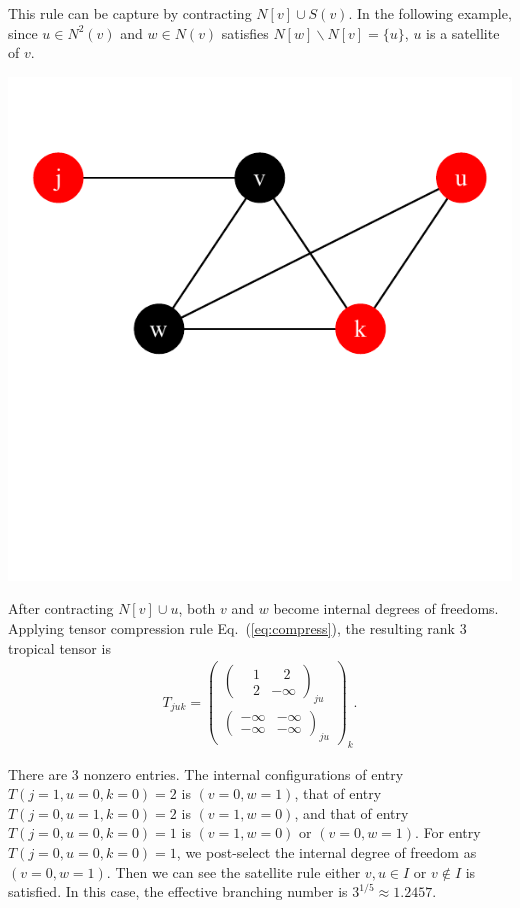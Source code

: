 \documentclass{article}
\newcommand{\<}{\langle}
\renewcommand{\>}{\rangle}
\newcommand{\Eq}[1]{Eq.~(\ref{#1})}
\theoremstyle{definition}\newtheorem{definition}{\textit{Definition}}
\begin{document}
This rule can be capture by contracting $N[v] \cup S(v)$.
In the following example, since $u \in N^2(v)$ and $w \in N(v)$ satisfies $N[w] \backslash N[v] = \{u\}$, $u$ is a satellite of $v$.

\centerline{\includegraphics[width=0.4\columnwidth,trim={0 3.5cm 0 1cm},clip]{../notebooks/satellite.pdf}}

After contracting $N[v] \cup u$, both $v$ and $w$ become internal degrees of freedoms.
Applying tensor compression rule \Eq{eq:compress}, the resulting rank 3 tropical tensor is
\begin{align}
    T_{juk} = \left(\begin{matrix}
        \left(\begin{matrix}
        ~~~~1 & ~~~~2 \\
        ~~~~2 & -\infty
        \end{matrix}\right)_{ju}\\
        \left(\begin{matrix}
        -\infty & -\infty \\
        -\infty & -\infty
        \end{matrix}\right)_{ju}
    \end{matrix}\right)_{k}.
\end{align}

There are 3 nonzero entries. The internal configurations of entry $T(j=1, u=0, k=0) = 2$ is $(v=0, w =1)$,
that of entry $T(j=0, u=1, k=0)=2$ is $(v=1, w=0)$, and that of entry $T(j=0, u=0, k=0)=1$ is $(v=1, w=0)$ or $(v=0, w=1)$.
For entry $T(j=0, u=0, k=0)=1$, we post-select the internal degree of freedom as $(v=0, w=1)$.
Then we can see the satellite rule either ${v, u} \in I$ or $v \notin I$ is satisfied.
In this case, the effective branching number is $3^{1/5}\approx 1.2457$. 
\end{document}
